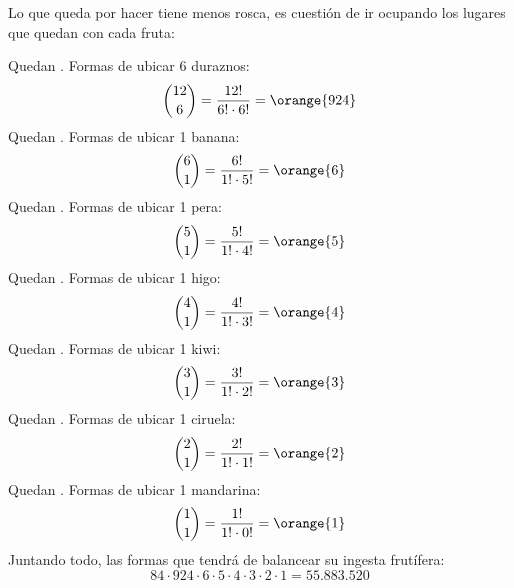 Lo que queda por hacer tiene menos rosca, es cuestión de ir ocupando los lugares que quedan con cada fruta:

Quedan . Formas de ubicar 6 duraznos:
$$
  \binom{12}{6} = \frac{12!}{6! \cdot 6!} = \orange{924}
$$
Quedan . Formas de ubicar 1 banana:
$$
  \binom{6}{1} = \frac{6!}{1! \cdot 5!} = \orange{6}
$$
Quedan . Formas de ubicar 1 pera:
$$
  \binom{5}{1} = \frac{5!}{1! \cdot 4!} = \orange{5}
$$
Quedan . Formas de ubicar 1 higo:
$$
  \binom{4}{1} = \frac{4!}{1! \cdot 3!} = \orange{4}
$$
Quedan . Formas de ubicar 1 kiwi:
$$
  \binom{3}{1} = \frac{3!}{1! \cdot 2!} = \orange{3}
$$
Quedan . Formas de ubicar 1 ciruela:
$$
  \binom{2}{1} = \frac{2!}{1! \cdot 1!} = \orange{2}
$$
Quedan . Formas de ubicar 1 mandarina:
$$
  \binom{1}{1} = \frac{1!}{1! \cdot 0!} = \orange{1}
$$
Juntando todo, las formas que tendrá de balancear su ingesta frutífera:
$$
  84 \cdot 924 \cdot 6 \cdot 5 \cdot 4 \cdot 3 \cdot 2 \cdot 1 = 55.883.520
$$

\begin{aportes}
  \item {}
  \item {}

\end{aportes}
